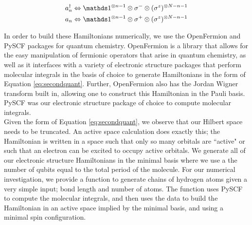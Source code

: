 \begin{align}
    a_n^\dagger & \Leftrightarrow \openone^{\otimes n -1} \otimes  \sigma^- \otimes (\sigma^z)^{\otimes N- n -1} \\
    a_n & \Leftrightarrow \openone^{\otimes n -1} \otimes  \sigma^+ \otimes (\sigma^z)^{\otimes N- n -1}
\end{align}

In order to build these Hamiltonians numerically, we use the OpenFermion \cite{mcclean2020openfermion} and PySCF \cite{sun2018pyscf} packages for quantum chemistry. OpenFermion is a library that allows for the easy manipulation of fermionic operators that arise in quantum chemistry, as well as it interfaces with a variety of electronic structure packages that perform molecular integrals in the basis of choice to generate Hamiltonians in the form of Equation \ref{eq:secondquant}. Further, OpenFermion also has the Jordan Wigner transform built in, allowing one to construct this Hamiltonian in the Pauli basis. PySCF was our electronic structure package of choice to compute molecular integrals. \\

Given the form of Equation \ref{eq:secondquant}, we observe that our Hilbert space needs to be truncated. An active space calculation does exactly this; the Hamiltonian is written in a space such that only so many orbitals are ``active" or such that an electron can be excited to occupy active orbitals. We generate all of our electronic structure Hamiltonians in the minimal basis where we use a the number of qubits equal to the total period of the molecule. For our numerical investigation, we provide a function to generate chains of hydrogen atoms given a very simple input; bond length and number of atoms. The function uses PySCF to compute the molecular integrals, and then uses the data to build the Hamiltonian in an active space implied by the minimal basis, and using a minimal spin configuration. 

